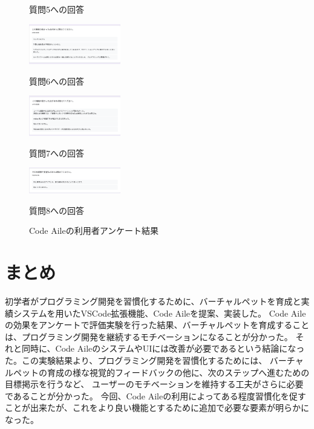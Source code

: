 \documentclass[12pt,twoside]{jbook}
\begin{document}
\begin{figure}[t]
\begin{minipage}[b]{0.48\linewidth}
    \caption{質問5への回答}
    \label{fig:q5}
  \end{minipage}
  \hfill
  \begin{minipage}[b]{0.48\linewidth}
    \centering
    \includegraphics[width=4cm]{images/q6}
    \caption{質問6への回答}
    \label{fig:q6}
  \end{minipage}
  \hfill
  \begin{minipage}[b]{0.48\linewidth}
    \centering
    \includegraphics[width=4cm]{images/q7}
    \caption{質問7への回答}
    \label{fig:q7}
  \end{minipage}
  \hfill
  \begin{minipage}[b]{0.48\linewidth}
    \centering
    \includegraphics[width=4cm]{images/q8}
    \caption{質問8への回答}
    \label{fig:q8}
  \end{minipage}
  \hfill
  \caption{Code Aileの利用者アンケート結果}
  \label{fig:results}
\end{figure}

\chapter{まとめ}
 初学者がプログラミング開発を習慣化するために、バーチャルペットを育成と実績システムを用いたVSCode拡張機能、Code Aileを提案、実装した。
Code Aileの効果をアンケートで評価実験を行った結果、バーチャルペットを育成することは、プログラミング開発を継続するモチベーションになることが分かった。
それと同時に、Code AileのシステムやUIには改善が必要であるという結論になった。この実験結果より、プログラミング開発を習慣化するためには、
バーチャルペットの育成の様な視覚的フィードバックの他に、次のステップへ進むための目標掲示を行うなど、
ユーザーのモチベーションを維持する工夫がさらに必要であることが分かった。
今回、Code Aileの利用によってある程度習慣化を促すことが出来たが、これをより良い機能とするために追加で必要な要素が明らかになった。


%
%




\appendix
\end{document}
